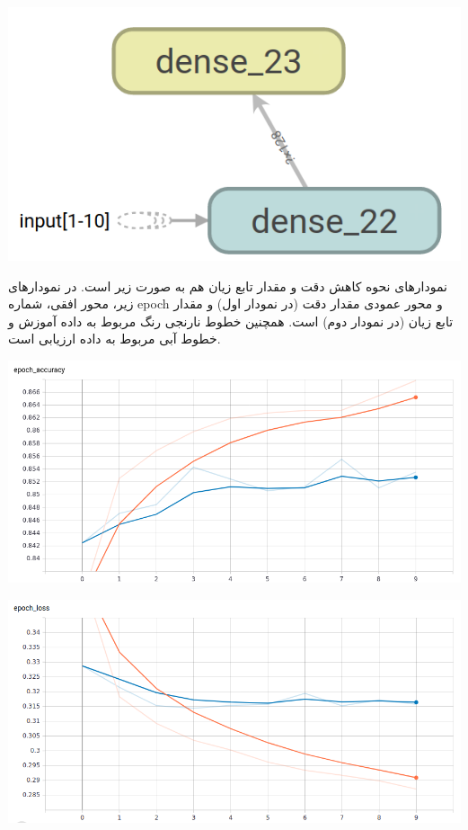 \documentclass{article}
\begin{document}
\begin{center}
	\includegraphics[scale=0.45]{model_graph.png} 
\end{center}    

نمودارهای نحوه کاهش دقت و مقدار تابع زیان هم به صورت زیر است.
در نمودارهای زیر، محور افقی، شماره epoch و محور عمودی مقدار دقت (در نمودار اول) و مقدار تابع زیان (در نمودار دوم) است. همچنین خطوط نارنجی رنگ مربوط به داده آموزش و خطوط آبی مربوط به داده ارزیابی است.


\begin{center}
	\includegraphics[scale=0.45]{epoch_accuracy.png} 
\end{center}    

\begin{center}
	\includegraphics[scale=0.45]{epoch_loss.png} 
\end{center}    





\medskip

\small
\LTR 
\latin
\end{document}

